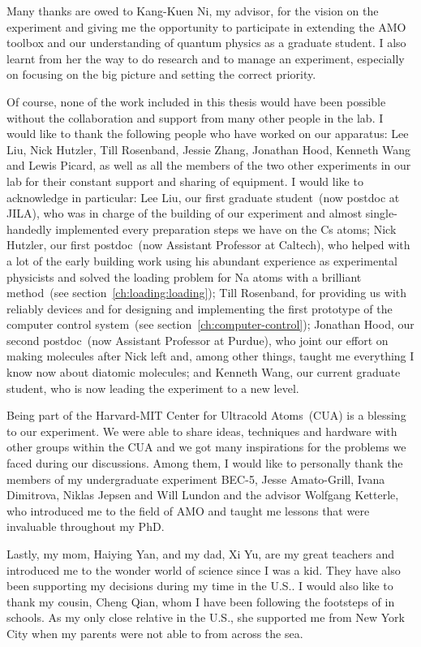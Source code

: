
Many thanks are owed to Kang-Kuen Ni, my advisor,
for the vision on the experiment and giving me the opportunity
to participate in extending the AMO toolbox and our understanding of quantum physics
as a graduate student.
I also learnt from her the way to do research and to manage an experiment,
especially on focusing on the big picture and setting the correct priority.

Of course, none of the work included in this thesis would have been possible
without the collaboration and support from many other people in the lab.
I would like to thank the following people who have worked on our apparatus:
Lee Liu, Nick Hutzler, Till Rosenband, Jessie Zhang,
Jonathan Hood, Kenneth Wang and Lewis Picard,
as well as all the members of the two other experiments in our lab
for their constant support and sharing of equipment.
I would like to acknowledge in particular:
Lee Liu, our first graduate student~(now postdoc at JILA),
who was in charge of the building of our experiment and almost single-handedly implemented
every preparation steps we have on the Cs atoms;
Nick Hutzler, our first postdoc~(now Assistant Professor at Caltech),
who helped with a lot of the early building work using his abundant experience
as experimental physicists and solved the loading problem for Na atoms
with a brilliant method~(see section~\ref{ch:loading:loading});
Till Rosenband, for providing us with reliably devices
and for designing and implementing the first prototype
of the computer control system~(see section~\ref{ch:computer-control});
Jonathan Hood, our second postdoc~(now Assistant Professor at Purdue),
who joint our effort on making molecules after Nick left and, among other things,
taught me everything I know now about diatomic molecules;
and Kenneth Wang, our current graduate student,
who is now leading the experiment to a new level.

Being part of the Harvard-MIT Center for Ultracold Atoms~(CUA) is a blessing to our experiment.
We were able to share ideas, techniques and hardware with other groups within the CUA
and we got many inspirations for the problems we faced during our discussions.
Among them, I would like to personally thank the members of my undergraduate experiment BEC-5,
Jesse Amato-Grill, Ivana Dimitrova, Niklas Jepsen and Will Lundon
and the advisor Wolfgang Ketterle, who introduced me to the field of AMO
and taught me lessons that were invaluable throughout my PhD.

Lastly, my mom, Haiying Yan, and my dad, Xi Yu, are my great teachers
and introduced me to the wonder world of science since I was a kid.
They have also been supporting my decisions during my time in the U.S..
I would also like to thank my cousin, Cheng Qian,
whom I have been following the footsteps of in schools.
As my only close relative in the U.S., she supported me from New York City
when my parents were not able to from across the sea.
